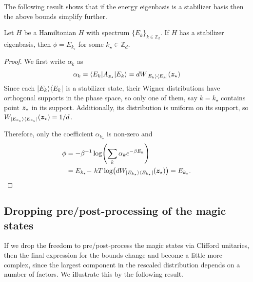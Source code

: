 \documentclass[pra,
aps,
twocolumn,
superscriptaddress,
groupedaddress,
nofootinbib,
reprint
]{revtex4-1}
\begin{document}
The following result shows that if the energy eigenbasis is a stabilizer basis then the above bounds simplify further.
\begin{proposition} \label{sharp-phi}
	Let $H$ be a Hamiltonian $H$ with spectrum $\{E_k\}_{k \in \mathbb{Z}_d}$.
	If $H$ has a stabilizer eigenbasis, then $\phi = E_{k_{\star}}$ for some $k_{\star} \in \mathbb{Z}_d$.
\end{proposition}
\begin{proof}
	We first write $\alpha_k$ as
\begin{equation}
	\alpha_k = \langle E_k | A_{\bm{z}_{\star}} |E_k\rangle = d W_{|E_k\rangle\langle E_k|}(\bm{z}_{\star})
\end{equation}
Since each $|E_k\rangle\langle E_k|$ is a stabilizer state, their Wigner distributions have orthogonal supports in the phase space, so only one of them, say $k = k_{\star}$ contains point $\bm{z}_{\star}$ in its support. 
Additionally, its distribution is uniform on its support, so $W_{|E_{k_\star}\rangle\langle E_{k_\star}|}(\bm{z}_{\star}) = 1/d$.

Therefore, only the coefficient $\alpha_{k_{\star}}$ is non-zero and
\begin{align}
\phi &= -\beta^{-1}\log (\sum_k \alpha_k e^{-\beta E_k}) \nonumber \\
&=E_{k_{\star}} \hspace{-2pt}-\hspace{1pt} kT \log (d W_{|E_{k_\star}\rangle\langle E_{k_\star}|}(\bm{z}_{\star})) =E_{k_{\star}}.
\end{align}

\end{proof}

\subsection{Dropping pre/post-processing of the magic states}
\label{app:cliff_processing}

If we drop the freedom to pre/post-process the magic states via Clifford unitaries, then the final expression for the bounds change and become a little more complex, since the largest component in the rescaled distribution depends on a number of factors. We illustrate this by the following result.
\end{document}
